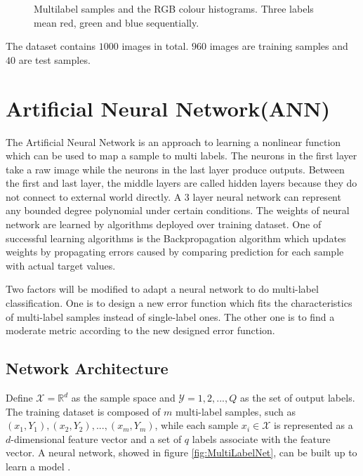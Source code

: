 \begin{figure}[!htb]
\caption{Multilabel samples and the RGB colour histograms. Three labels mean red, green and blue sequentially. }
\end{figure}

The dataset contains $1000$ images in total. $960$ images are training samples and $40$ are test samples. 

\section{Artificial Neural Network(ANN)}

The Artificial Neural Network is an approach to learning a nonlinear function which can be used to map a sample to multi labels. The neurons in the first layer take a raw image while the neurons in the last layer produce outputs. Between the first and last layer, the middle layers are called hidden layers because they do not connect to external world directly. A 3 layer neural network can represent any bounded degree polynomial under certain conditions\citep{barron1993universal}. The weights of neural network are learned by algorithms deployed over training dataset. One of successful learning algorithms is the Backpropagation algorithm which updates weights by propagating errors caused by comparing prediction for each sample with actual target values.

Two factors will be modified to adapt a neural network to do multi-label classification. One is to design a new error function which fits the characteristics of multi-label samples instead of single-label ones. The other one is to find a moderate metric according to the new designed error function.

\subsection{Network Architecture}

Define $\mathcal{X} = \mathbb{R}^{d}$ as the sample space and $\mathcal{Y} = {1,2,...,Q}$ as the set of output labels. The training dataset is composed of $m$ multi-label samples, such as ${(x_{1}, Y_{1}),(x_{2}, Y_{2}),...,(x_{m}, Y_{m})}$, while each sample $x_{i} \in \mathcal{X}$ is represented as a $d$-dimensional feature vector and a set of $q$ labels associate with the feature vector. A neural network, showed in figure \ref{fig:MultiLabelNet}, can be built up to learn a model .

